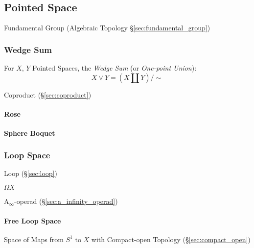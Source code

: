 \subsection{Pointed Space}\label{sec:pointed_space}

\fist Fundamental Group (Algebraic Topology \S\ref{sec:fundamental_group})



\subsubsection{Wedge Sum}\label{sec:wedge_sum}

For $X$, $Y$ Pointed Spaces, the \emph{Wedge Sum} (or \emph{One-point
  Union}):
\[
  X \vee Y = (X \amalg Y) / \sim
\]

Coproduct (\S\ref{sec:coproduct})



\paragraph{Rose}\label{sec:rose}\hfill

\paragraph{Sphere Boquet}\label{sec:sphere_boquet}\hfill



\subsubsection{Loop Space}\label{sec:loop_space}

Loop (\S\ref{sec:loop})

$\Omega X$

A$_\infty$-operad (\S\ref{sec:a_infinity_operad})



\paragraph{Free Loop Space}\label{sec:free_loop_space}\hfill

Space of Maps from $S^1$ to $X$ with Compact-open Topology
(\S\ref{sec:compact_open})



